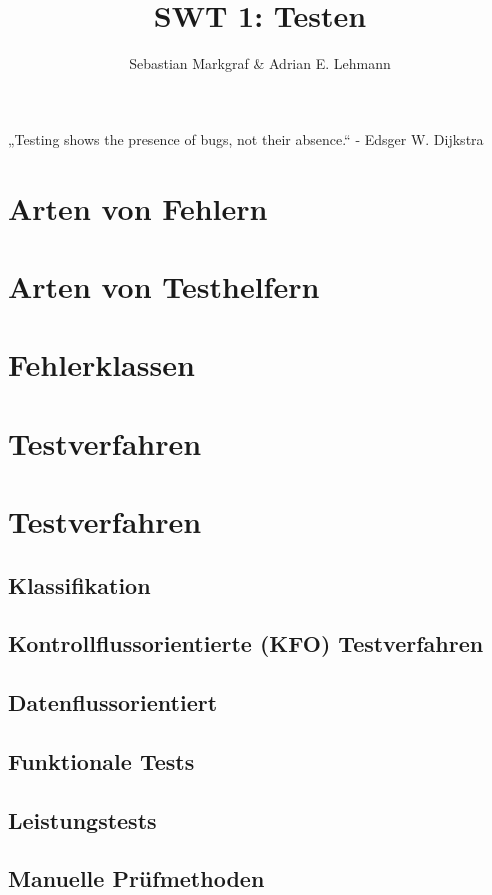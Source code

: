 \documentclass[a4paper]{article}
\title{SWT 1: Testen}
\author{Sebastian Markgraf \& Adrian E. Lehmann}
\theoremstyle{break}
\begin{document}
	\maketitle
	\begin{huge}
	\begin{center} „Testing shows the presence of bugs, not their absence.“ - Edsger W. Dijkstra
	\end{center}
	\end{huge}
	\tableofcontents
	\newpage
\section{Arten von Fehlern}
\section{Arten von Testhelfern}
\section{Fehlerklassen}
\section{Testverfahren}
\section{Testverfahren}
\subsection{Klassifikation}
\subsection{Kontrollflussorientierte (KFO) Testverfahren}
\subsection{Datenflussorientiert}
\subsection{Funktionale Tests}
\subsection{Leistungstests}
\subsection{Manuelle Prüfmethoden}
\end{document}
